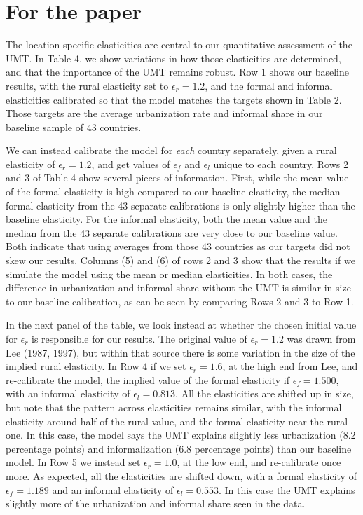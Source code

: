 \documentclass[10pt]{article}
\begin{document}
\onehalfspacing 

\section{For the paper}
The location-specific elasticities are central to our quantitative assessment of the UMT. In Table 4, we show variations in how those elasticities are determined, and that the importance of the UMT remains robust. Row 1 shows our baseline results, with the rural elasticity set to $\epsilon_r = 1.2$, and the formal and informal elasticities calibrated so that the model matches the targets shown in Table 2. Those targets are the average urbanization rate and informal share in our baseline sample of 43 countries.

We can instead calibrate the model for \textit{each} country separately, given a rural elasticity of $\epsilon_r = 1.2$, and get values of $\epsilon_f$ and $\epsilon_l$ unique to each country. Rows 2 and 3 of Table 4 show several pieces of information. First, while the mean value of the formal elasticity is high compared to our baseline elasticity, the median formal elasticity from the 43 separate calibrations is only slightly higher than the baseline elasticity. For the informal elasticity, both the mean value and the median from the 43 separate calibrations are very close to our baseline value. Both indicate that using averages from those 43 countries as our targets did not skew our results. Columns (5) and (6) of rows 2 and 3 show that the results if we simulate the model using the mean or median elasticities. In both cases, the difference in urbanization and informal share without the UMT is similar in size to our baseline calibration, as can be seen by comparing Rows 2 and 3 to Row 1. 

In the next panel of the table, we look instead at whether the chosen initial value for $\epsilon_r$ is responsible for our results. The original value of $\epsilon_r = 1.2$ was drawn from Lee (1987, 1997), but within that source there is some variation in the size of the implied rural elasticity. In Row 4 if we set $\epsilon_r = 1.6$, at the high end from Lee, and re-calibrate the model, the implied value of the formal elasticity if $\epsilon_f = 1.500$, with an informal elasticity of $\epsilon_l = 0.813$. All the elasticities are shifted up in size, but note that the pattern across elasticities remains similar, with the informal elasticity around half of the rural value, and the formal elasticity near the rural one. In this case, the model says the UMT explains slightly less urbanization (8.2 percentage points) and informalization (6.8 percentage points) than our baseline model. In Row 5 we instead set $\epsilon_r = 1.0$, at the low end, and re-calibrate once more. As expected, all the elasticities are shifted down, with a formal elasticity of $\epsilon_f = 1.189$ and an informal elasticity of $\epsilon_l = 0.553$. In this case the UMT explains slightly more of the urbanization and informal share seen in the data. 
\end{document}
